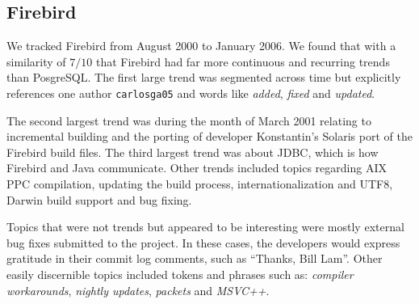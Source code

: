 \documentclass[times, 10pt,twocolumn]{article}
\newcommand{\shrinkit}{\vspace*{-.3em}}
\begin{document}


\shrinkit
\subsection{Firebird}
\shrinkit


We tracked Firebird from August 2000 to January 2006. We found that with a
similarity of $7/10$ that Firebird had far more continuous and
recurring trends than PosgreSQL.  The first large trend was segmented
across time but explicitly references one author \texttt{carlosga05}
and words like \emph{added}, \emph{fixed} and \emph{updated}.

The second largest trend was during the month of March 2001 relating
to incremental building and the porting of developer Konstantin's
Solaris port of the Firebird build files. The third largest trend was
about JDBC, which is how Firebird and Java communicate.  Other trends
included topics regarding AIX PPC compilation, updating the build
process, internationalization and UTF8, Darwin build support and bug
fixing.

Topics that were not trends but appeared to be interesting were mostly
external bug fixes submitted to the project.  In these cases, the
developers would express gratitude in their commit log comments, such
as ``Thanks, Bill Lam''.  Other easily discernible topics included
tokens and phrases such as: \emph{compiler workarounds}, \emph{nightly
  updates}, \emph{packets} and \emph{MSVC++}.




\end{document}
